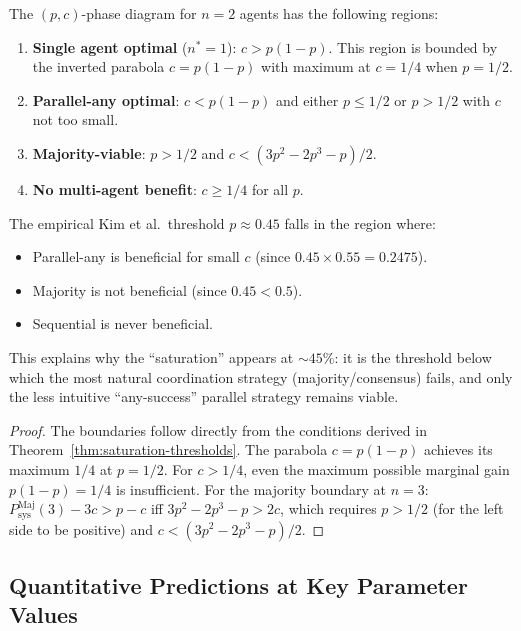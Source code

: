 \begin{proposition}
\label{prop:phase-diagram}
The $(p, c)$-phase diagram for $n = 2$ agents has the following regions:
\begin{enumerate}
  \item \textbf{Single agent optimal} ($n^* = 1$): $c > p(1-p)$. This region is
    bounded by the inverted parabola $c = p(1-p)$ with maximum at $c = 1/4$
    when $p = 1/2$.

  \item \textbf{Parallel-any optimal}: $c < p(1-p)$ and either $p \leq 1/2$ or
    $p > 1/2$ with $c$ not too small.

  \item \textbf{Majority-viable}: $p > 1/2$ and $c < (3p^2 - 2p^3 - p)/2$.

  \item \textbf{No multi-agent benefit}: $c \geq 1/4$ for all $p$.
\end{enumerate}

The empirical Kim et al.\ threshold $p \approx 0.45$ falls in the region where:
\begin{itemize}
  \item Parallel-any is beneficial for small $c$ (since $0.45 \times 0.55 = 0.2475$).
  \item Majority is not beneficial (since $0.45 < 0.5$).
  \item Sequential is never beneficial.
\end{itemize}
This explains why the ``saturation'' appears at $\sim 45\%$: it is the threshold
below which the most natural coordination strategy (majority/consensus) fails,
and only the less intuitive ``any-success'' parallel strategy remains viable.
\end{proposition}

\begin{proof}
The boundaries follow directly from the conditions derived in
Theorem~\ref{thm:saturation-thresholds}. The parabola $c = p(1-p)$ achieves its
maximum $1/4$ at $p = 1/2$. For $c > 1/4$, even the maximum possible marginal
gain $p(1-p) = 1/4$ is insufficient. For the majority boundary at $n = 3$:
$P_{\mathrm{sys}}^{\mathrm{Maj}}(3) - 3c > p - c$ iff $3p^2 - 2p^3 - p > 2c$,
which requires $p > 1/2$ (for the left side to be positive) and $c < (3p^2 - 2p^3 - p)/2$.
\end{proof}

\subsection{Quantitative Predictions at Key Parameter Values}
\label{subsec:numerical}


